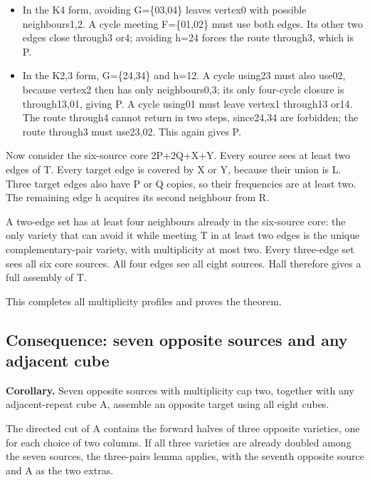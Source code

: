 \documentclass[
  10pt,
]{article}
\providecommand{\tightlist}{%
  \setlength{\itemsep}{0pt}\setlength{\parskip}{0pt}}
\begin{document}
\begin{itemize}
\tightlist
\item
  In the K4 form, avoiding G=\{03,04\} leaves vertex0 with possible
  neighbours1,2. A cycle meeting F=\{01,02\} must use both edges. Its
  other two edges close through3 or4; avoiding h=24 forces the route
  through3, which is P.
\item
  In the K2,3 form, G=\{24,34\} and h=12. A cycle using23 must also
  use02, because vertex2 then has only neighbours0,3; its only
  four-cycle closure is through13,01, giving P. A cycle using01 must
  leave vertex1 through13 or14. The route through4 cannot return in two
  steps, since24,34 are forbidden; the route through3 must use23,02.
  This again gives P.
\end{itemize}

Now consider the six-source core 2P+2Q+X+Y. Every source sees at least
two edges of T. Every target edge is covered by X or Y, because their
union is L. Three target edges also have P or Q copies, so their
frequencies are at least two. The remaining edge h acquires its second
neighbour from R.

A two-edge set has at least four neighbours already in the six-source
core: the only variety that can avoid it while meeting T in at least two
edges is the unique complementary-pair variety, with multiplicity at
most two. Every three-edge set sees all six core sources. All four edges
see all eight sources. Hall therefore gives a full assembly of T.

This completes all multiplicity profiles and proves the theorem.

\hypertarget{consequence-seven-opposite-sources-and-any-adjacent-cube}{%
\subsection*{Consequence: seven opposite sources and any adjacent
cube}\label{consequence-seven-opposite-sources-and-any-adjacent-cube}}

\textbf{Corollary.} Seven opposite sources with multiplicity cap two,
together with any adjacent-repeat cube A, assemble an opposite target
using all eight cubes.

The directed cut of A contains the forward halves of three opposite
varieties, one for each choice of two columns. If all three varieties
are already doubled among the seven sources, the three-pairs lemma
applies, with the seventh opposite source and A as the two extras.
\end{document}
